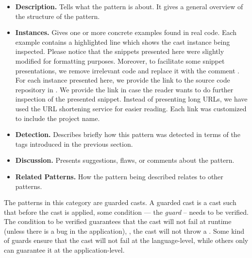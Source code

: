 \begin{itemize}
\item \textbf{Description.}
Tells what the pattern is about.
It gives a general overview of the structure of the pattern.
\item \textbf{Instances.}
Gives one or more concrete examples found in real code.
%
%
Each example contains a highlighted line which shows the cast instance being inspected.
Please notice that the snippets presented here were slightly
modified for formatting purposes.
Moreover, to facilitate some snippet presentations,
we remove irrelevant code and replace it with the
comment \code{// [...]}.
For each instance presented here, we provide the link to the source code repository in \lgtm{}.
We provide the link in case the reader wants to do further inspection
of the presented snippet.
%
%
Instead of presenting \lgtm{} long URLs,
we have used the URL shortening service
\href{https://bitly.com/}{\bitly} for easier reading.
%
%
Each \bitly{} link was customized to include the project name.
\item \textbf{Detection.}
Describes briefly how this pattern was detected in terms of the tags introduced in the previous section.
\item \textbf{Discussion.}
Presents suggestions, flaws, or comments about the pattern.
\item \textbf{Related Patterns.}
%
%
How the pattern being described relates to other patterns.
\end{itemize}


The patterns in this category are guarded casts.
A guarded cast is a cast such that before the cast is applied,
some condition --- the \emph{guard} -- needs to be verified.
The condition to be verified guarantees that the cast will not fail at runtime (unless there is a bug in the application), \ie,
the cast will not throw a .
Some kind of guards ensure that the cast will not fail at the language-level,
while others only can guarantee it at the application-level.










 


